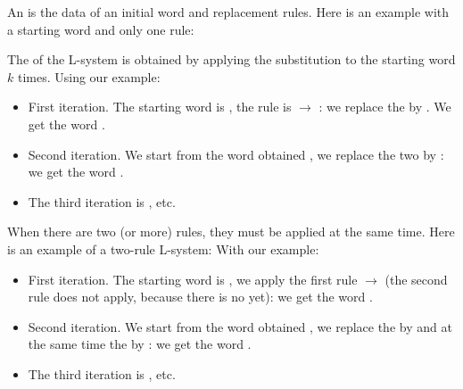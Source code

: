 \documentclass[11pt,class=report,crop=false]{standalone}
\begin{document}
\begin{cours}[L-system]
An  is the data of an initial word and replacement rules.
Here is an example with a starting word and only one rule: 


The  of the L-system is obtained by applying the substitution to the starting word $k$ times.
Using our example:
\begin{itemize}
  \item First iteration. The starting word is , the rule is  $\rightarrow$ : we replace the  by . We get the word .
  
  \item Second iteration. We start from the word obtained , we replace the two  by : we get the word .
  
  \item The third iteration is , etc. 

\end{itemize}

When there are two (or more) rules, they must be applied at the same time.
Here is an example of a two-rule L-system:
With our example:
\begin{itemize}
  \item First iteration. The starting word is , we apply the first rule  $\rightarrow$  (the second rule does not apply, because there is no  yet): we get the word .
  
  \item Second iteration. We start from the word obtained , we replace the  by  and at the same time the  by : we get the word .
  
  \item The third iteration is , etc.  
\end{itemize}

\end{cours}
\end{document}
